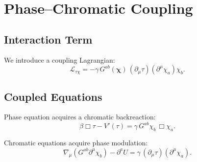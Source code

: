 \chapter{Phase--Chromatic Coupling}

\section{Interaction Term}

We introduce a coupling Lagrangian:
\[
\mathcal{L}_{\tau\chi}
=
-\gamma\,
G^{ab}(\bm{\chi})\, 
(\partial_\mu \tau)(\partial^\mu \chi_a)\chi_b .
\]

\section{Coupled Equations}

Phase equation acquires a chromatic backreaction:
\[
\beta \Box \tau - V'(\tau)
=
\gamma\, G^{ab}\chi_b\,\Box\chi_a .
\]

Chromatic equations acquire phase modulation:
\[
\nabla_\mu(G^{ab}\partial^\mu\chi_b)
- \partial^a U
=
\gamma\,(\partial_\mu\tau)(\partial^\mu\chi_a).
\]


